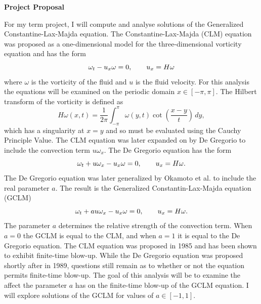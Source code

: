 \documentclass[12pt]{article}
\newcommand{\lr}{\left(}
\newcommand{\rr}{\right)}
\def\w{\omega}
\def\wt{\omega_t}
\def\wx{\omega_x}
\def\ux{u_x}
\numberwithin{equation}{section}
\begin{document}
\begin{flushleft}
\begin{large}
\textbf{Project Proposal}
\end{large}
\end{flushleft}
\noindent
For my term project, I will compute and analyse solutions of the Generalized Constantine-Lax-Majda equation. The Constantine-Lax-Majda (CLM) equation was proposed as a one-dimensional model for the three-dimensional vorticity equation and has the form\vspace{-12pt}
$$\wt - \ux\w = 0, \qquad \ux = H\w\vspace{-12pt}$$
where $\w$ is the vorticity of the fluid and $u$ is the fluid velocity. For this analysis the equations will be examined on the periodic domain $x\in[-\pi,\pi]$. The Hilbert transform of the vorticity is defined as
$$H\w(x,t) = \frac{1}{2\pi}\int_{-\pi}^{\pi} \w(y,t)\cot\lr\frac{x-y}{t}\rr \,dy,$$
which has a singularity at $x=y$ and so must be evaluated using the Cauchy Principle Value. The CLM equation was later expanded on by De Gregorio to include the convection term $u\wx$. The De Gregorio equation has the form\vspace{-12pt}
$$\wt + u\wx - \ux\w = 0, \qquad \ux = H\w.\vspace{-12pt}$$
The De Gregorio equation was later generalized by Okamoto et al. to include the real parameter $a$. The result is the Generalized Constantin-Lax-Majda equation (GCLM)\vspace{-12pt}
$$\wt + au\wx - \ux\w = 0, \qquad \ux = H\w.\vspace{-12pt}$$
The parameter $a$ determines the relative strength of the convection term. When $a=0$ the GCLM is equal to the CLM, and when $a=1$ it is equal to the De Gregorio equation. The CLM equation was proposed in 1985 and has been shown to exhibit finite-time blow-up. While the De Gregorio equation was proposed shortly after in 1989, questions still remain as to whether or not the equation permits finite-time blow-up. The goal of this analysis will be to examine the affect the parameter $a$ has on the finite-time blow-up of the GCLM equation. I will explore solutions of the GCLM for values of $a\in[-1,1]$. 

\pagebreak
\end{document}
